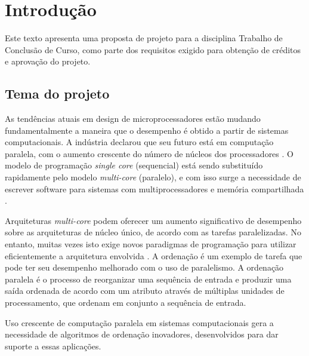 \chapter{Introdução}

Este texto apresenta uma proposta de projeto para a disciplina Trabalho de Conclusão de Curso, como parte dos requisitos exigido para obtenção de créditos e aprovação do projeto. 

\section{Tema do projeto}




As tendências atuais em design de microprocessadores estão mudando fundamentalmente a maneira que o desempenho é obtido a partir de sistemas computacionais. 
A indústria declarou que seu futuro está em computação paralela, com o aumento crescente do número de núcleos dos processadores \cite{Asanovic:2009}.
O modelo de programação \textit{single core} (sequencial) está sendo substituído rapidamente pelo modelo \textit{multi-core} (paralelo), e com isso surge a necessidade de escrever software para sistemas com multiprocessadores e memória compartilhada \cite{Ernst:2009}.

Arquiteturas \textit{multi-core} podem oferecer um aumento significativo de desempenho sobre as arquiteturas de núcleo único, de acordo com as tarefas paralelizadas. No entanto, muitas vezes isto exige novos paradigmas de programação para utilizar eficientemente a arquitetura envolvida \cite{Prinslow:2011}. A ordenação
é um exemplo de tarefa que pode ter seu desempenho melhorado com o uso de paralelismo. 
A ordenação paralela é o processo de reorganizar uma sequência de entrada e produzir uma saída ordenada de acordo com um atributo através de múltiplas unidades de processamento, que ordenam em conjunto a sequência de entrada. 


Uso crescente de computação paralela em sistemas computacionais gera a necessidade de algoritmos de ordenação inovadores, desenvolvidos para dar suporte a essas aplicações. 

